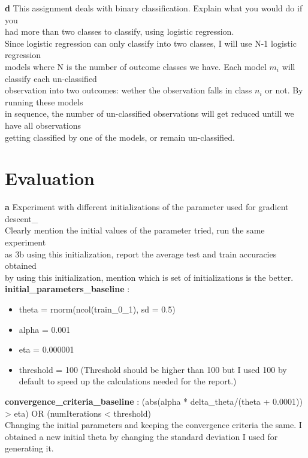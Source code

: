 \documentclass[a4paper]{article}
\begin{document}
\textbf{d} This assignment deals with binary classification. Explain what you would do if you \\
had more than two classes to classify, using logistic regression.\\
Since logistic regression can only classify into two classes, I will use N-1 logistic regression\\ 
models where N is the number of outcome classes we have. Each model $m_i$ will classify  each un-classified \\
observation into two outcomes: wether the observation falls in class $n_i$ or not. By running these models \\
in sequence, the number of un-classified observations will get reduced untill we have all observations \\
getting classified by one of the models, or remain un-classified.

\section{Evaluation}

\textbf{a} Experiment with different initializations of the parameter used for gradient descent_\\
Clearly mention the initial values of the parameter tried, run the same experiment \\
as 3b using this initialization, report the average test and train accuracies obtained \\
by using this initialization, mention which is set of initializations is the better.\\

\textbf{initial_parameters_baseline} : 

\begin{itemize}
  \item theta = rnorm(ncol(train_0_1), sd = 0.5)
  \item alpha = 0.001
  \item eta = 0.000001
  \item threshold = 100 (Threshold should be higher than 100 but I used 100 by default to speed up the calculations needed for the report.)
\end{itemize}

\textbf{convergence_criteria_baseline} : (abs(alpha * delta_theta/(theta + 0.0001)) > eta) OR (numIterations < threshold) \\

Changing the initial parameters and keeping the convergence criteria the same. I obtained a new initial theta by changing the standard deviation I used for generating it.
\end{document}
